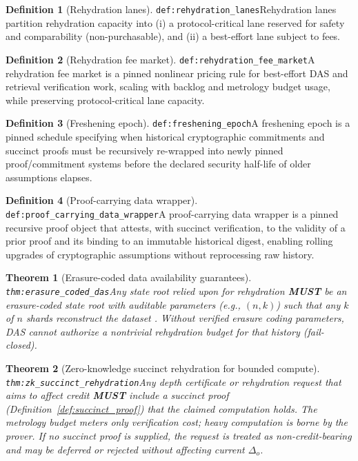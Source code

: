 \documentclass[11pt]{article}
\theoremstyle{definition}
\newtheorem{definition}{Definition}
\theoremstyle{plain}
\newtheorem{theorem}{Theorem}
\newcommand{\MUST}{\textbf{MUST}}
\newcommand{\lbl}[1]{\texttt{\footnotesize\nolinkurl{#1}}}
\newcommand{\DefLabel}[1]{\hfill{\small\lbl{#1}}}
\newcommand{\deltao}{\Delta_o}
\begin{document}
\begin{definition}[Rehydration lanes]\DefLabel{def:rehydration_lanes}\label{def:rehydration_lanes}
Rehydration lanes partition rehydration capacity into (i) a protocol-critical lane reserved for safety and comparability (non-purchasable), and (ii) a best-effort lane subject to fees.
\end{definition}

\begin{definition}[Rehydration fee market]\DefLabel{def:rehydration_fee_market}\label{def:rehydration_fee_market}
A rehydration fee market is a pinned nonlinear pricing rule for best-effort DAS and retrieval verification work, scaling with backlog and metrology budget usage, while preserving protocol-critical lane capacity.
\end{definition}

\begin{definition}[Freshening epoch]\DefLabel{def:freshening_epoch}\label{def:freshening_epoch}
A freshening epoch is a pinned schedule specifying when historical cryptographic commitments and succinct proofs must be recursively re-wrapped into newly pinned proof/commitment systems before the declared security half-life of older assumptions elapses.
\end{definition}

\begin{definition}[Proof-carrying data wrapper]\DefLabel{def:proof_carrying_data_wrapper}\label{def:proof_carrying_data_wrapper}
A proof-carrying data wrapper is a pinned recursive proof object that attests, with succinct verification, to the validity of a prior proof and its binding to an immutable historical digest, enabling rolling upgrades of cryptographic assumptions without reprocessing raw history.
\end{definition}

\begin{theorem}[Erasure-coded data availability guarantees]\DefLabel{thm:erasure_coded_das}\label{thm:erasure_coded_das}
Any state root relied upon for rehydration \MUST{} be an erasure-coded state root with auditable parameters (e.g., $(n,k)$) such that any $k$ of $n$ shards reconstruct the dataset \cite{ReedSolomon1960}.
Without verified erasure coding parameters, DAS cannot authorize a nontrivial rehydration budget for that history (fail-closed).
\end{theorem}

\begin{theorem}[Zero-knowledge succinct rehydration for bounded compute]\DefLabel{thm:zk_succinct_rehydration}\label{thm:zk_succinct_rehydration}
Any depth certificate or rehydration request that aims to affect credit \MUST{} include a succinct proof (Definition~\ref{def:succinct_proof}) that the claimed computation holds.
The metrology budget meters only verification cost; heavy computation is borne by the prover.
If no succinct proof is supplied, the request is treated as non-credit-bearing and may be deferred or rejected without affecting current $\deltao$.
\end{theorem}
\end{document}
